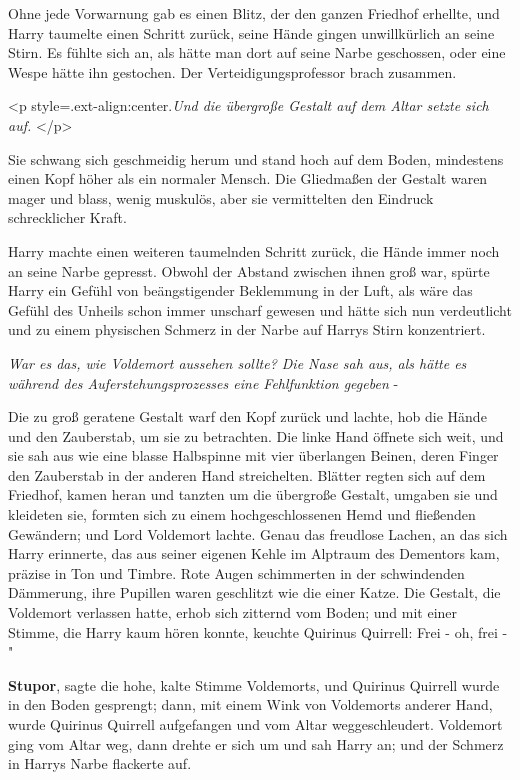 Ohne jede Vorwarnung gab es einen Blitz, der den ganzen Friedhof erhellte, und
Harry taumelte einen Schritt zurück, seine Hände gingen unwillkürlich an seine
Stirn. Es fühlte sich an, als hätte man dort auf seine Narbe geschossen, oder
eine Wespe hätte ihn gestochen. Der Verteidigungsprofessor brach zusammen.

<p style=\grqq{}.ext-align:center\grqq{}.\emph{Und die übergroße Gestalt auf dem
Altar setzte sich auf. }</p>

Sie schwang sich geschmeidig herum und stand hoch auf dem Boden, mindestens
einen Kopf höher als ein normaler Mensch. Die Gliedmaßen der Gestalt waren mager
und blass, wenig muskulös, aber sie vermittelten den Eindruck schrecklicher
Kraft.

Harry machte einen weiteren taumelnden Schritt zurück, die Hände immer noch an
seine Narbe gepresst. Obwohl der Abstand zwischen ihnen groß war, spürte Harry
ein Gefühl von beängstigender Beklemmung in der Luft, als wäre das Gefühl des
Unheils schon immer unscharf gewesen und hätte sich nun verdeutlicht und zu
einem physischen Schmerz in der Narbe auf Harrys Stirn konzentriert.

\emph{War es das, wie Voldemort aussehen sollte? Die Nase sah aus, als hätte es
während des Auferstehungsprozesses eine Fehlfunktion gegeben }-

Die zu groß geratene Gestalt warf den Kopf zurück und lachte, hob die Hände und
den Zauberstab, um sie zu betrachten. Die linke Hand öffnete sich weit, und sie
sah aus wie eine blasse Halbspinne mit vier überlangen Beinen, deren Finger den
Zauberstab in der anderen Hand streichelten. Blätter regten sich auf dem
Friedhof, kamen heran und tanzten um die übergroße Gestalt, umgaben sie und
kleideten sie, formten sich zu einem hochgeschlossenen Hemd und fließenden
Gewändern; und Lord Voldemort lachte. Genau das freudlose Lachen, an das sich
Harry erinnerte, das aus seiner eigenen Kehle im Alptraum des Dementors kam,
präzise in Ton und Timbre. Rote Augen schimmerten in der schwindenden Dämmerung,
ihre Pupillen waren geschlitzt wie die einer Katze. Die Gestalt, die Voldemort
verlassen hatte, erhob sich zitternd vom Boden; und mit einer Stimme, die Harry
kaum hören konnte, keuchte Quirinus Quirrell: \glqq Frei - oh, frei -"

\glqq \textbf{Stupor}\grqq{}, sagte die hohe, kalte Stimme Voldemorts, und
Quirinus Quirrell wurde in den Boden gesprengt; dann, mit einem Wink von
Voldemorts anderer Hand, wurde Quirinus Quirrell aufgefangen und vom Altar
weggeschleudert. Voldemort ging vom Altar weg, dann drehte er sich um und sah
Harry an; und der Schmerz in Harrys Narbe flackerte auf.


